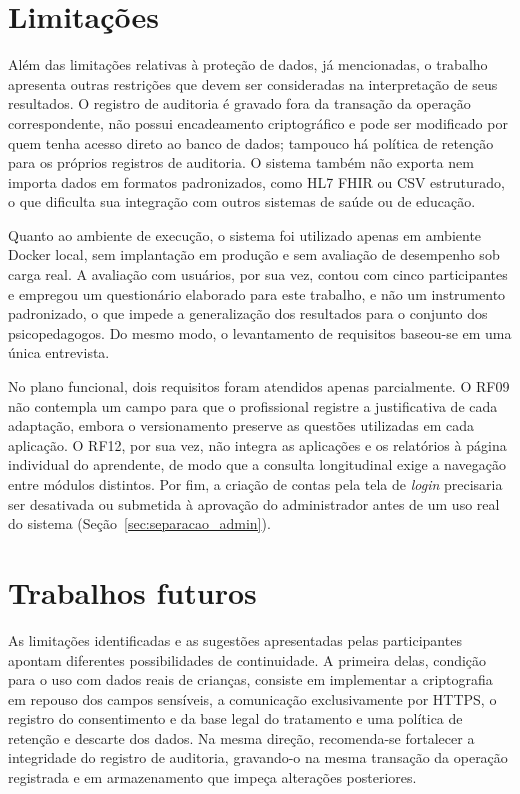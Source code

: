 \section{Limitações}\label{sec:limitacoes}

Além das limitações relativas à proteção de dados, já mencionadas, o trabalho apresenta outras restrições que devem ser consideradas na interpretação de seus resultados. O registro de auditoria é gravado fora da transação da operação correspondente, não possui encadeamento criptográfico e pode ser modificado por quem tenha acesso direto ao banco de dados; tampouco há política de retenção para os próprios registros de auditoria. O sistema também não exporta nem importa dados em formatos padronizados, como HL7 FHIR ou CSV estruturado, o que dificulta sua integração com outros sistemas de saúde ou de educação.

Quanto ao ambiente de execução, o sistema foi utilizado apenas em ambiente Docker local, sem implantação em produção e sem avaliação de desempenho sob carga real. A avaliação com usuários, por sua vez, contou com cinco participantes e empregou um questionário elaborado para este trabalho, e não um instrumento padronizado, o que impede a generalização dos resultados para o conjunto dos psicopedagogos. Do mesmo modo, o levantamento de requisitos baseou-se em uma única entrevista.

No plano funcional, dois requisitos foram atendidos apenas parcialmente. O RF09 não contempla um campo para que o profissional registre a justificativa de cada adaptação, embora o versionamento preserve as questões utilizadas em cada aplicação. O RF12, por sua vez, não integra as aplicações e os relatórios à página individual do aprendente, de modo que a consulta longitudinal exige a navegação entre módulos distintos. Por fim, a criação de contas pela tela de \textit{login} precisaria ser desativada ou submetida à aprovação do administrador antes de um uso real do sistema (Seção~\ref{sec:separacao_admin}).

\section{Trabalhos futuros}

As limitações identificadas e as sugestões apresentadas pelas participantes apontam diferentes possibilidades de continuidade. A primeira delas, condição para o uso com dados reais de crianças, consiste em implementar a criptografia em repouso dos campos sensíveis, a comunicação exclusivamente por HTTPS, o registro do consentimento e da base legal do tratamento e uma política de retenção e descarte dos dados. Na mesma direção, recomenda-se fortalecer a integridade do registro de auditoria, gravando-o na mesma transação da operação registrada e em armazenamento que impeça alterações posteriores.

